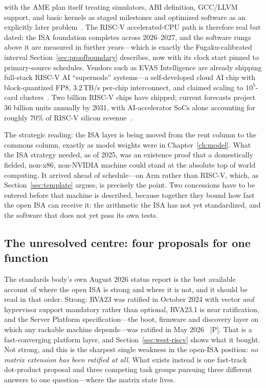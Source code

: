 with the AME plan itself treating simulators, ABI definition, GCC/LLVM support, and basic kernels as staged milestones and optimized software as an explicitly later problem~\cite{amePlan}. The RISC-V accelerated-CPU path is therefore real but dated: the ISA foundation completes across 2026--2027, and the software rungs above it are measured in further years---which is exactly the Fugaku-calibrated interval Section~\ref{sec:proofboundary} describes, now with its clock start pinned to primary-source schedules. Vendors such as EVAS Intelligence are already shipping full-stack RISC-V AI ``supernode'' systems---a self-developed cloud AI chip with block-quantized FP8, 3.2\,TB/s per-chip interconnect, and claimed scaling to $10^5$-card clusters~\cite{evas}. Two billion RISC-V chips have shipped; current forecasts project 36 billion units annually by 2031, with AI-accelerator SoCs alone accounting for roughly 70\% of RISC-V silicon revenue~\cite{shd-2026}.

The strategic reading: the ISA layer is being moved from the rent column to the commons column, exactly as model weights were in Chapter~\ref{ch:model}. What the ISA strategy needed, as of 2025, was an existence proof that a domestically fielded, non-x86, non-NVIDIA machine could stand at the absolute top of world computing. It arrived ahead of schedule---on Arm rather than RISC-V, which, as Section~\ref{sec:template} argues, is precisely the point. Two concessions have to be entered before that machine is described, because together they bound how fast the open ISA can receive it: the arithmetic the ISA has not yet standardized, and the software that does not yet pass its own tests.

\subsection{The unresolved centre: four proposals for one function}
\label{sec:matrixgap}

The standards body's own August 2026 status report is the best available account of where the open ISA is strong and where it is not, and it should be read in that order. Strong: RVA23 was ratified in October 2024 with vector \emph{and} hypervisor support mandatory rather than optional, RVA23.1 is near ratification, and the Server Platform specification---the boot, firmware and discovery layer on which any rackable machine depends---was ratified in May 2026~\cite{hc2026-riscv-profiles} [P]. That is a fast-converging platform layer, and Section~\ref{sec:west-riscv} shows what it bought. Not strong, and this is the sharpest single weakness in the open-ISA position: \emph{no matrix extension has been ratified at all}. What exists instead is one fast-track dot-product proposal and three competing task groups pursuing three different answers to one question---where the matrix state lives.

